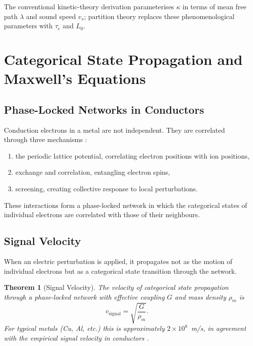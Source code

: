 \documentclass[twocolumn,10pt,a4paper]{article}
\newtheorem{theorem}{Theorem}[section]
\theoremstyle{definition}
\theoremstyle{remark}
\newcommand{\tauC}{\tau_{\mathrm{c}}}
\begin{document}
The conventional kinetic-theory derivation \citep{chapman1990} parameterises $\kappa$ in terms of mean free path $\lambda$ and sound speed $v_s$; partition theory replaces these phenomenological parameters with $\tauC$ and $L_0$.

\section{Categorical State Propagation and Maxwell's Equations}
\label{sec:maxwell}

\subsection{Phase-Locked Networks in Conductors}

Conduction electrons in a metal are not independent. They are correlated through three mechanisms \citep{ashcroft1976,kittel2005}:

\begin{enumerate}[leftmargin=1.2em,nosep]
\item the periodic lattice potential, correlating electron positions with ion positions,
\item exchange and correlation, entangling electron spins,
\item screening, creating collective response to local perturbations.
\end{enumerate}

These interactions form a phase-locked network in which the categorical states of individual electrons are correlated with those of their neighbours.

\subsection{Signal Velocity}

When an electric perturbation is applied, it propagates not as the motion of individual electrons but as a categorical state transition through the network.

\begin{theorem}[Signal Velocity]
\label{thm:signal_velocity}
The velocity of categorical state propagation through a phase-locked network with effective coupling $G$ and mass density $\rho_m$ is
\begin{equation}
v_{\mathrm{signal}} = \sqrt{\frac{G}{\rho_m}}.
\label{eq:signal_velocity}
\end{equation}
For typical metals (Cu, Al, etc.) this is approximately $2\times10^8$~m/s, in agreement with the empirical signal velocity in conductors \citep{griffiths2017em,jackson1999}.
\end{theorem}
\end{document}
